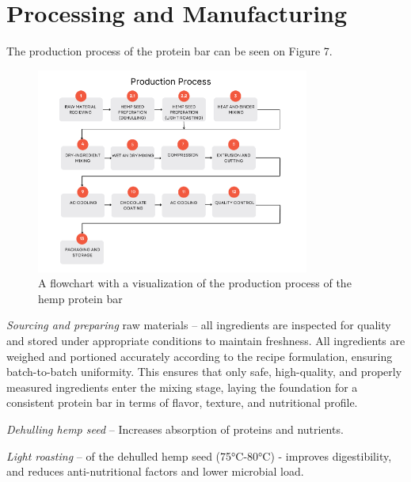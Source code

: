 \setlength{\headheight}{12.71342pt}
\addtolength{\topmargin}{-0.71342pt}

\section{Processing and Manufacturing}
The production process of the protein bar can be seen on Figure 7.
\begin{figure}[H]
    \centering
    \includegraphics[width=0.8\textwidth]{Figures/fig_process_01.png}
    \caption{A flowchart with a visualization of the production process of the hemp protein bar}
    \label{fig:process_flow_diagram}
\end{figure}

\textit{Sourcing and preparing} raw materials – all ingredients are inspected for quality and stored under appropriate conditions to maintain freshness. All ingredients are weighed and portioned accurately according to the recipe formulation, ensuring batch-to-batch uniformity. This ensures that only safe, high-quality, and properly measured ingredients enter the mixing stage, laying the foundation for a consistent protein bar in terms of flavor, texture, and nutritional profile.

\vspace{1em}
\textit{Dehulling hemp seed} – Increases absorption of proteins and nutrients.

\vspace{1em}
\textit{Light roasting} – of the dehulled hemp seed (75°C-80°C) - improves digestibility, and reduces anti-nutritional factors and lower microbial load.

